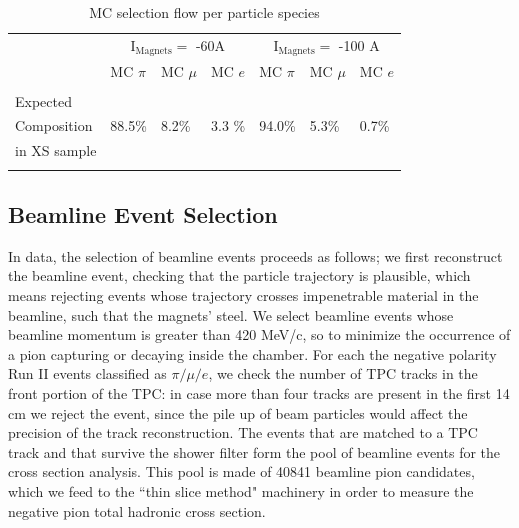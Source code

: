 \documentclass[aps,prl,twocolumn,showpacs,superscriptaddress,groupedaddress]{revtex4}  %
\begin{document}
\begin{table}
\caption{\label{tab:MCafterCutContaminants}MC selection flow per particle species}
\begin{ruledtabular}
\begin{tabular}{ l | l | l | l | l | l | l  |}
 &  \multicolumn{3}{c|}{I$_{\text{Magnets}} =$ -60A} & \multicolumn{3}{c|}{I$_{\text{Magnets}} =$ -100 A }\\
& MC $\pi$   & MC  $ \mu$ & MC  $e$ & MC  $\pi$ & MC  $\mu$ & MC  $e$  \\
\hline
&  &  &  & & &\\  
Expected &  &  &  & & &\\  
Composition&  88.5\%   & 8.2\%   & 3.3 \%   & 94.0\%	& 5.3\% & 0.7\%\\
in XS sample               &                      &                       &                   &                       &                        &\\  
&                      &                       &                   &                       &                        &\\  
\end{tabular}
\end{ruledtabular}
\end{table}






\subsection{\label{sec:EventSelection}Beamline Event Selection}
In data, the selection of beamline events proceeds as follows; we first reconstruct the beamline event, checking that the particle trajectory is plausible, which means rejecting events whose trajectory crosses impenetrable material in the beamline, such that the magnets' steel. We select beamline events whose beamline momentum is greater than 420 MeV/c, so to minimize the occurrence of a pion capturing or decaying inside the chamber.  For each the negative polarity Run II events classified as $\pi/\mu/e$, we check the number of TPC tracks in the front portion of the TPC: in case more than four tracks are present in the first 14 cm we reject the event,  since the pile up of beam particles would affect the precision of the track reconstruction.
The events that are matched to a TPC track and that survive the shower filter form the pool of beamline events for the cross section analysis. This pool is made of 40841 beamline pion candidates, which we feed to the ``thin slice method" machinery in order to measure the negative pion total hadronic cross section. 
\end{document}
